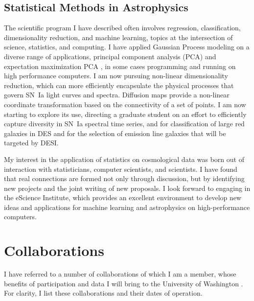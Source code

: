 \documentclass{article}
\newcommand{\where}{the University of Washington }
\newcommand{\where}{the University of Michigan }
\begin{document}
\subsection{Statistical Methods in Astrophysics}
The scientific program I have described often involves regression, classification, dimensionality reduction,
and machine learning, topics at the intersection of science, statistics, and computing.  I have applied Gaussian Process modeling
on a diverse range of applications, principal component
analysis (PCA) and expectation maximization PCA \cite{2012PhRvD..85l3530S,2013ApJ...766...84K,
2013PhRvD..87l3512H}, in some cases programming and running on high performance computers.
I am now pursuing non-linear dimensionality reduction, which can more efficiently encapsulate
the physical processes that govern SN~Ia light curves and spectra.
Diffusion maps provide a non-linear coordinate transformation based on the connectivity of a set of points.
I am now starting to explore its use, directing a graduate student on an effort
to efficiently capture diversity in SN~Ia spectral time series, and for classification of large red galaxies in DES
and for the selection of emission line galaxies that will be targeted by DESI.

My interest in the application of statistics on cosmological data
was born out of interaction with statisticians, computer scientists,
and scientists. I have found that real connections are formed not only through discussion,
but by identifying new projects and the joint writing of new proposals.
I look forward to engaging in
the eScience Institute, which provides an excellent environment to develop new ideas and applications
for machine learning and astrophysics on high-performance computers.


\section{Collaborations}
I have referred to a number of collaborations of which I am a member, whose benefits of participation
and data  I will bring to \where.  For clarity, I list these collaborations and their dates of operation.
\end{document}

